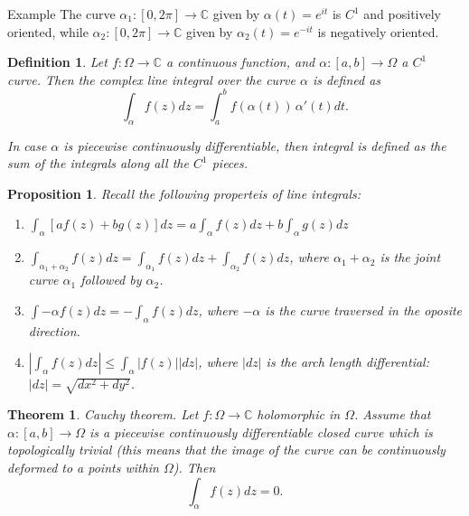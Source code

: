 \documentclass{amsart}
\newtheorem{thm}{Theorem}
\newtheorem{prop}{Proposition}
\newtheorem{mydef}{Definition}
\begin{document}
\alert{Example} The curve \(\alpha_1: [0,2\pi] \to \mathbb{C}\) given by \(\alpha(t) = e^{it}\) is \(C^1\) and positively oriented, while \(\alpha_2: [0,2\pi] \to \mathbb{C}\) given by \(\alpha_2(t) = e^{-it}\) is negatively oriented.

\begin{mydef}
Let \(f:\Omega \to \mathbb{C}\) a continuous function, and \(\alpha : [a,b] \to \Omega\) a \(C^1\) curve. Then the \alert{complex line integral} over the curve \(\alpha\) is defined as
\[\int_{\alpha}f(z) dz = \int_{a}^{b} f(\alpha(t)) \, \alpha'(t) dt.\]

In case \(\alpha\) is \alert{piecewise continuously differentiable}, then integral is defined as the sum of the integrals along all the \(C^1\) pieces.
\end{mydef}

\begin{prop}
Recall the following properteis of line integrals:
\begin{enumerate}
\item \(\int_{\alpha} [ af(z) + bg(z)]dz =  a \int_{\alpha} f(z) dz + b \int_{\alpha} g(z) dz\)
\item \(\int_{\alpha_1 + \alpha_2} f(z) dz = \int_{\alpha_1} f(z)dz + \int_{\alpha_2} f(z)dz\), where \(\alpha_1 + \alpha_2\) is the joint curve \(\alpha_1\) followed by \(\alpha_2\).
\item \(\int{-\alpha} f(z) dz = - \int_{\alpha} f(z)dz\), where \(-\alpha\) is the curve traversed in the oposite direction.
\item \(|\int_{\alpha} f(z)dz | \leq \int_{\alpha} |f(z)| |dz|\), where \(|dz|\) is the arch length differential: \(|dz| = \sqrt{dx^2 + dy^2}\).
\end{enumerate}
\end{prop}


\begin{thm}
\alert{Cauchy theorem}. Let \(f:\Omega \to \mathbb{C}\) holomorphic in \(\Omega\). Assume that \(\alpha: [a,b] \to \Omega\) is a piecewise continuously differentiable closed curve which is topologically trivial (this means that the image of the curve can be continuously deformed to a points within \(\Omega\)). Then
\[ \int_{\alpha} f(z) dz = 0. \]
\end{thm}
\end{document}
